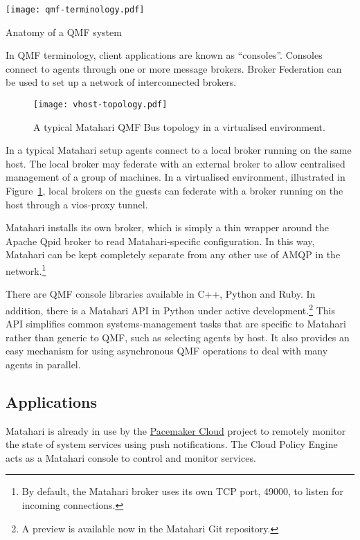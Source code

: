 \documentclass{tufte-handout}
\begin{document}
\begin{marginfigure}
\texttt{[image: qmf-terminology.pdf]}
\caption{Anatomy of a QMF system}
\label{fig:qmf-terminology}
\end{marginfigure}

In QMF terminology, client applications are known as ``consoles''. Consoles connect to agents through one or more message brokers. Broker Federation can be used to set up a network of interconnected brokers.

\begin{figure}[b]
\texttt{[image: vhost-topology.pdf]}
\caption{A typical Matahari QMF Bus topology in a virtualised environment.}
\label{fig:vhost-topology}
\end{figure}

In a typical Matahari setup agents connect to a local broker running on the same host. The local broker may federate with an external broker to allow centralised management of a group of machines.
In a virtualised environment, illustrated in Figure~\ref{fig:vhost-topology}, local brokers on the guests can federate with a broker running on the host through a  vios-proxy tunnel.
 
Matahari installs its own broker, which is simply a thin wrapper around the Apache Qpid broker to read Matahari-specific configuration. In this way, Matahari can be kept completely separate from any other use of AMQP in the network.\footnote{By default, the Matahari broker uses its own TCP port, 49000, to listen for incoming connections.}

There are QMF console libraries available in C++, Python and Ruby.
In addition, there is a Matahari API in Python under active development.\footnote{A preview is available now in the Matahari Git repository.} This API simplifies common systems-management tasks that are specific to Matahari rather than generic to QMF, such as selecting agents by host. It also provides an easy mechanism for using asynchronous QMF operations to deal with many agents in parallel.

\subsection{Applications}

Matahari is already in use by the \href{http://pacemaker-cloud.org/}{Pacemaker Cloud} project to remotely monitor the state of system services using push notifications. The Cloud Policy Engine acts as a Matahari console to control and monitor services.
\end{document}
